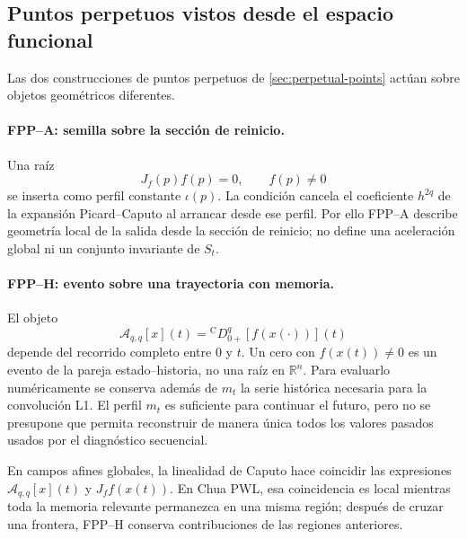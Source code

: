 \subsection{Puntos perpetuos vistos desde el espacio funcional}

Las dos construcciones de puntos perpetuos de \cref{sec:perpetual-points}
actúan sobre objetos geométricos diferentes.

\paragraph{FPP--A: semilla sobre la sección de reinicio.}
Una raíz
\begin{equation}
 J_f(p)f(p)=0,\qquad f(p)\neq0
 \label{eq:geofo-fppa}
\end{equation}
se inserta como perfil constante \(\iota(p)\). La condición cancela el
coeficiente \(h^{2q}\) de la expansión Picard--Caputo al arrancar desde ese
perfil. Por ello FPP--A describe geometría local de la salida desde la sección
de reinicio; no define una aceleración global ni un conjunto invariante de
\(S_t\).

\paragraph{FPP--H: evento sobre una trayectoria con memoria.}
El objeto
\begin{equation}
 \mathcal A_{q,q}[x](t)=
 {}^{\mathrm C}D_{0+}^{q}[f(x(\cdot))](t)
 \label{eq:geofo-fpph}
\end{equation}
depende del recorrido completo entre \(0\) y \(t\). Un cero con
\(f(x(t))\neq0\) es un evento de la pareja estado--historia, no una raíz en
\(\mathbb R^n\). Para evaluarlo numéricamente se conserva además de \(m_t\) la
serie histórica necesaria para la convolución L1. El perfil \(m_t\) es
suficiente para continuar el futuro, pero no se presupone que permita
reconstruir de manera única todos los valores pasados usados por el diagnóstico
secuencial.



En campos afines globales, la linealidad de Caputo hace coincidir las
expresiones \(\mathcal A_{q,q}[x](t)\) y \(J_ff(x(t))\). En Chua PWL,
esa coincidencia es local mientras toda la memoria relevante permanezca
en una misma región; después de cruzar una frontera, FPP--H conserva
contribuciones de las regiones anteriores.

